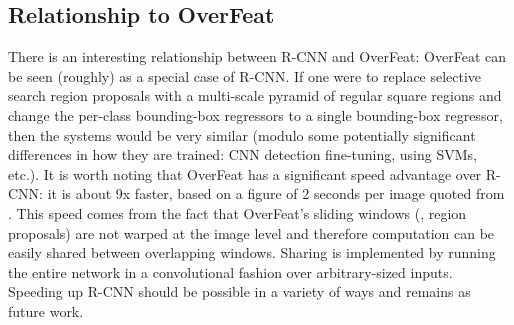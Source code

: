 \subsection{Relationship to OverFeat}
There is an interesting relationship between R-CNN and OverFeat:
OverFeat can be seen (roughly) as a special case of R-CNN.
If one were to replace selective search region proposals with a multi-scale pyramid of regular square regions and change the per-class bounding-box regressors to a single bounding-box regressor, then the systems would be very similar (modulo some potentially significant differences in how they are trained: CNN detection fine-tuning, using SVMs, etc.).
It is worth noting that OverFeat has a significant speed advantage over R-CNN: it is about 9x faster, based on a figure of 2 seconds per image quoted from \cite{overfeat}.
This speed comes from the fact that OverFeat's sliding windows (\ie, region proposals) are not warped at the image level and therefore computation can be easily shared between overlapping windows.
Sharing is implemented by running the entire network in a convolutional fashion over arbitrary-sized inputs.
Speeding up R-CNN should be possible in a variety of ways and remains as future work.

